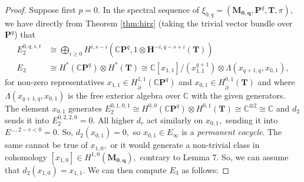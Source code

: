 \begin{proof}
    Suppose first $p=0.$ In the spectral sequence of $\xi_{0,q} = (\mathbf{M_{0,q}}, \mathbf{P}^q, \mathbf{T}, \pi),$ we have directly from Theorem \ref{thm:hirz} (taking the trivial vector bundle over $\mathbf{P}^q$) that
    \begin{align*}
        E^{0,q,s,t}_2 &\cong \bigoplus_{i\ge 0}H^{i, s-i}(\mathbb{C}\mathbf{P}^q, 1\otimes \mathbf{H}^{-i, q-s + i}(\mathbf{T}))\\
        E_2 &\cong H^*(\mathbb{C}\mathbf{P}^q) \otimes H^*(\mathbf{T})  \cong \mathbb{C}[x_{1,1}]/(x_{1,1}^{q+1})\otimes \Lambda(x_{q+1, q}, x_{0,1}),
    \end{align*}
    for non-zero representatives $x_{1,1}\in H_{\bar\partial}^{1,1}(\mathbb{C}\mathbf{P}^q)$ and $x_{0,1}\in H_{\bar\partial}^{0,1}(\mathbf{T})$ and where $\Lambda(x_{q+1, q}, x_{0,1})$ is the free exterior algebra over $\mathbb{C}$ with the given generators. The element $x_{0,1}$ generates $E^{0,1,0,1}_2 \cong H^{0,0}(\mathbb{C}\mathbf{P}^q)\otimes H^{0,1}(\mathbf{T})\cong \mathbb{C}^{\otimes 2}\cong \mathbb{C}$ and $d_2$ sends it into $E^{0,2,2,0}_2 = 0.$ All higher $d_r$ act similarly on $x_{0,1},$ sending it into $E^{\dots, 2-r < 0} = 0.$ So, $d_2(x_{0,1}) = 0,$ so $x_{0,1}\in E_\infty$ is a \textit{permanent cocycle}. The same cannot be true of $x_{1,0},$ or it would generate a non-trivial class in cohomology $[x_{1,0}]\in H^{1,0}(\mathbf{M_{0,q}}),$ contrary to Lemma 7. So, we can assume that $d_2(x_{1,0}) = x_{1,1}.$ We can then compute $E_3$ as follows:


\end{proof}
